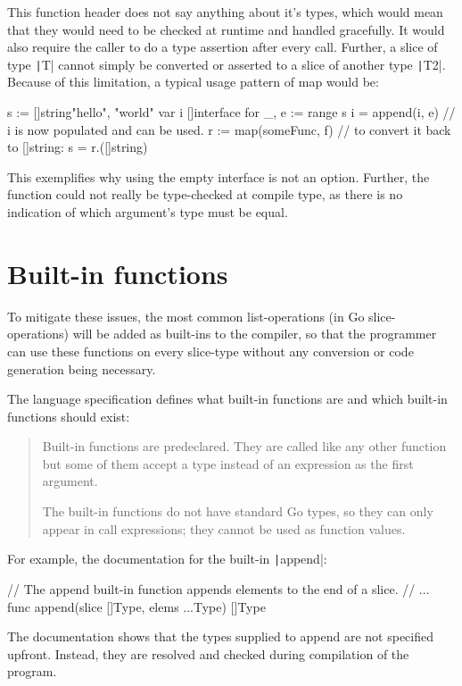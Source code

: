 This function header does not say anything about it's types, which would
mean that they would need to be checked at runtime and handled gracefully. It
would also require the caller to do a type assertion after every call. Further,
a slice of type \texttt|T| cannot simply be converted or asserted to a slice of another type
\texttt|T2|\autocite{go-interface-slice-conv}\autocite{go-interface-slice-conv2}.
Because of this limitation, a typical usage pattern of map would be:
\begin{gocode}
s := []string{"hello", "world"}
var i []interface{}
for _, e := range s {
	i = append(i, e)
}
// i is now populated and can be used.
r := map(someFunc, f)
// to convert it back to []string:
s = r.([]string)
\end{gocode}

This exemplifies why using the empty interface is not an option. Further, the
function could not really be type-checked at compile type, as there is no indication
of which argument's type must be equal.

\section{Built-in functions}

To mitigate these issues, the most common list-operations (in Go slice-operations) will
be added as built-ins to the compiler, so that the programmer can use these functions
on every slice-type without any conversion or code generation being necessary.

The language specification defines what built-in functions are and which built-in
functions should exist:
\begin{quote}
    Built-in functions are predeclared. They are called like any other function
    but some of them accept a type instead of an expression as the first argument.

    The built-in functions do not have standard Go types, so they can only appear
    in call expressions; they cannot be used as function values.\autocite{go-spec-builtins}
\end{quote}

For example, the documentation for the built-in \texttt|append|:
\begin{gocode}
// The append built-in function appends elements to the end of a slice.
// ...
func append(slice []Type, elems ...Type) []Type
\end{gocode}

The documentation shows that the types supplied to append are not specified upfront.
Instead, they are resolved and checked during compilation of the program.

